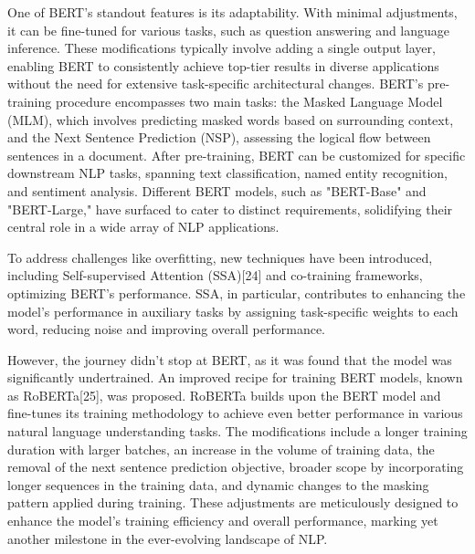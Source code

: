 \documentclass[fleqn,10pt]{thescipub} %
\begin{document}
One of BERT's standout features is its adaptability. With minimal adjustments, it can be fine-tuned for various tasks, such as question answering and language inference. These modifications typically involve adding a single output layer, enabling BERT to consistently achieve top-tier results in diverse applications without the need for extensive task-specific architectural changes. BERT's pre-training procedure encompasses two main tasks: the Masked Language Model (MLM), which involves predicting masked words based on surrounding context, and the Next Sentence Prediction (NSP), assessing the logical flow between sentences in a document. After pre-training, BERT can be customized for specific downstream NLP tasks, spanning text classification, named entity recognition, and sentiment analysis. Different BERT models, such as "BERT-Base" and "BERT-Large," have surfaced to cater to distinct requirements, solidifying their central role in a wide array of NLP applications.

To address challenges like overfitting, new techniques have been introduced, including Self-supervised Attention (SSA)[24] and co-training frameworks, optimizing BERT's performance. SSA, in particular, contributes to enhancing the model's performance in auxiliary tasks by assigning task-specific weights to each word, reducing noise and improving overall performance.

However, the journey didn't stop at BERT, as it was found that the model was significantly undertrained. An improved recipe for training BERT models, known as RoBERTa[25], was proposed. RoBERTa builds upon the BERT model and fine-tunes its training methodology to achieve even better performance in various natural language understanding tasks. The modifications include a longer training duration with larger batches, an increase in the volume of training data, the removal of the next sentence prediction objective, broader scope by incorporating longer sequences in the training data, and dynamic changes to the masking pattern applied during training. These adjustments are meticulously designed to enhance the model's training efficiency and overall performance, marking yet another milestone in the ever-evolving landscape of NLP.
\end{document}
